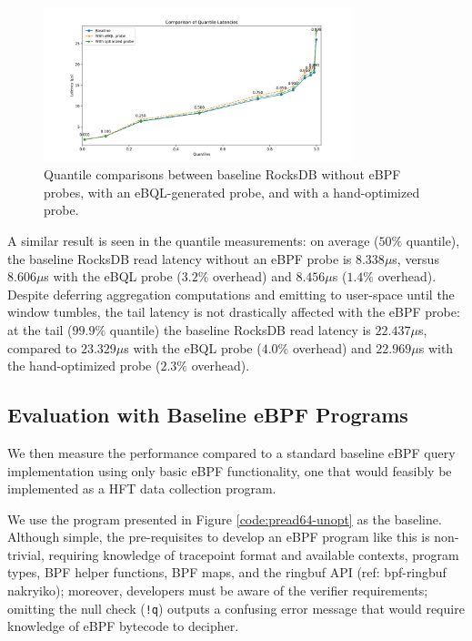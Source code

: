 \begin{figure}[htpb]
    \centering
    \includegraphics[width=0.8\textwidth]{diagrams/opt-eval-quantiles.png}
    \caption{Quantile comparisons between baseline RocksDB without eBPF probes, with an
    eBQL-generated probe, and with a hand-optimized probe.}
    \label{fig:opt-eval-quantiles}
\end{figure}

A similar result is seen in the quantile measurements: on average ($50\%$ quantile), the baseline
RocksDB read latency without an eBPF probe is $8.338\mu$s, versus $8.606\mu$s with the eBQL probe
($3.2\%$ overhead) and $8.456\mu$s ($1.4\%$ overhead). Despite deferring aggregation computations
and emitting to user-space until the window tumbles, the tail latency is not drastically affected
with the eBPF probe: at the tail ($99.9\%$ quantile) the baseline RocksDB read latency is
$22.437\mu$s, compared to $23.329\mu$s with the eBQL probe ($4.0\%$ overhead) and $22.969\mu$s with
the hand-optimized probe ($2.3\%$ overhead).

\subsection{Evaluation with Baseline eBPF Programs}
\label{baseline-eval}

We then measure the performance compared to a standard baseline eBPF query implementation using
only basic eBPF functionality, one that would feasibly be implemented as a HFT data collection
program.

We use the program presented in Figure \ref{code:pread64-unopt} as the baseline. Although simple,
the pre-requisites to develop an eBPF program like this is non-trivial, requiring knowledge of
tracepoint format and available contexts, program types, BPF helper functions, BPF maps, and the
ringbuf API (ref: bpf-ringbuf nakryiko); moreover, developers must be aware of the verifier
requirements; omitting the null check (\texttt{!q}) outputs a confusing error message that would
require knowledge of eBPF bytecode to decipher.

